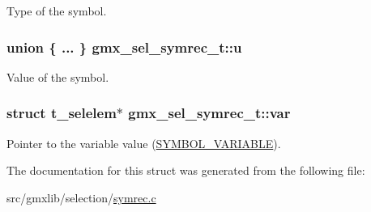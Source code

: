 \-Type of the symbol. \hypertarget{structgmx__sel__symrec__t_af1438f767fb9950502cb039b0980746a}{
\subsubsection[{u}]{\setlength{\rightskip}{0pt plus 5cm}union \{ ... \}                                 {\bf gmx\-\_\-sel\-\_\-symrec\-\_\-t\-::u}}}\label{structgmx__sel__symrec__t_af1438f767fb9950502cb039b0980746a}
\-Value of the symbol. \hypertarget{structgmx__sel__symrec__t_a6636424751725afafe11a2a2b1a376f7}{
\subsubsection[{var}]{\setlength{\rightskip}{0pt plus 5cm}struct {\bf t\-\_\-selelem}$\ast$ {\bf gmx\-\_\-sel\-\_\-symrec\-\_\-t\-::var}}}\label{structgmx__sel__symrec__t_a6636424751725afafe11a2a2b1a376f7}
\-Pointer to the variable value (\hyperlink{symrec_8h_a3d55b48f8dc057ea3df3fdc68ee116cba456be8edf768d9b767b0b7ee790201da}{\-S\-Y\-M\-B\-O\-L\-\_\-\-V\-A\-R\-I\-A\-B\-L\-E}). 

\-The documentation for this struct was generated from the following file\-:\begin{DoxyCompactItemize}
\item 
src/gmxlib/selection/\hyperlink{symrec_8c}{symrec.\-c}\end{DoxyCompactItemize}
